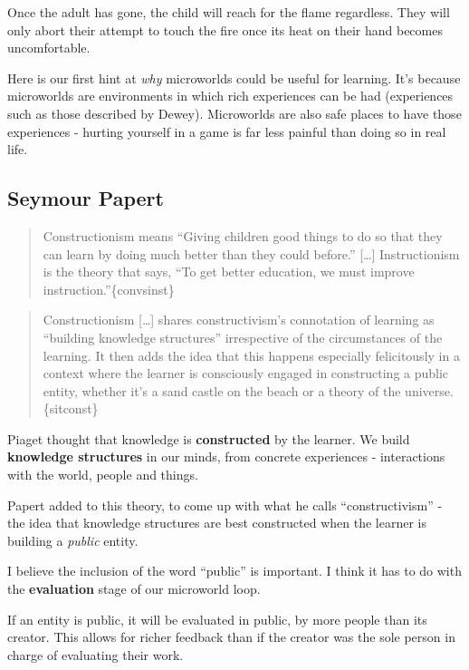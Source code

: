 Once the adult has gone, the child will reach for the flame regardless.
They will only abort their attempt to touch the fire once its heat on
their hand becomes uncomfortable.

Here is our first hint at \emph{why} microworlds could be useful for
learning. It's because microworlds are environments in which rich
experiences can be had (experiences such as those described by Dewey).
Microworlds are also safe places to have those experiences - hurting
yourself in a game is far less painful than doing so in real life.

\subsection{Seymour Papert}

\begin{quote}
Constructionism means ``Giving children good things to do so that they
can learn by doing much better than they could before.'' {[}\ldots{}{]}
Instructionism is the theory that says, ``To get better education, we
must improve instruction.''\{convsinst\}
\end{quote}

\begin{quote}
Constructionism {[}\ldots{}{]} shares constructivism's connotation of
learning as ``building knowledge structures'' irrespective of the
circumstances of the learning. It then adds the idea that this happens
especially felicitously in a context where the learner is consciously
engaged in constructing a public entity, whether it's a sand castle on
the beach or a theory of the universe. \{sitconst\}
\end{quote}

Piaget thought that knowledge is \textbf{constructed} by the learner. We
build \textbf{knowledge structures} in our minds, from concrete
experiences - interactions with the world, people and things.

Papert added to this theory, to come up with what he calls
``constructivism'' - the idea that knowledge structures are best
constructed when the learner is building a \emph{public} entity.

I believe the inclusion of the word ``public'' is important. I think it
has to do with the \textbf{evaluation} stage of our microworld loop.

If an entity is public, it will be evaluated in public, by more people
than its creator. This allows for richer feedback than if the creator
was the sole person in charge of evaluating their work.

